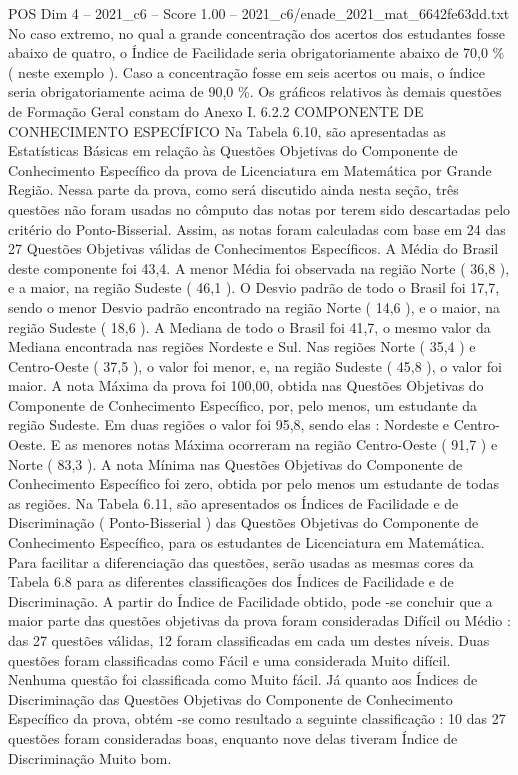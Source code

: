 \begin{textsample}{POS Dim 4 – 2021\_c6 – Score 1.00 – 2021\_c6/enade\_2021\_mat\_6642fe63dd.txt}
No caso extremo, no qual a grande concentração dos acertos dos estudantes fosse abaixo de quatro, o Índice de Facilidade seria obrigatoriamente abaixo de 70,0 \% ( neste exemplo ).
Caso a concentração fosse em seis acertos ou mais, o índice seria obrigatoriamente acima de 90,0 \%.
Os gráficos relativos às demais questões de Formação Geral constam do Anexo I. 6.2.2 COMPONENTE DE CONHECIMENTO ESPECÍFICO Na Tabela 6.10, são apresentadas as Estatísticas Básicas em relação às Questões Objetivas do Componente de Conhecimento Específico da prova de Licenciatura em Matemática por Grande Região.
Nessa parte da prova, como será discutido ainda nesta seção, três questões não foram usadas no cômputo das notas por terem sido descartadas pelo critério do Ponto-Bisserial.
Assim, as notas foram calculadas com base em 24 das 27 Questões Objetivas válidas de Conhecimentos Específicos.
A Média do Brasil deste componente foi 43,4.
A menor Média foi observada na região Norte ( 36,8 ), e a maior, na região Sudeste ( 46,1 ).
O Desvio padrão de todo o Brasil foi 17,7, sendo o menor Desvio padrão encontrado na região Norte ( 14,6 ), e o maior, na região Sudeste ( 18,6 ).
A Mediana de todo o Brasil foi 41,7, o mesmo valor da Mediana encontrada nas regiões Nordeste e Sul.
Nas regiões Norte ( 35,4 ) e Centro-Oeste ( 37,5 ), o valor foi menor, e, na região Sudeste ( 45,8 ), o valor foi maior.
A nota Máxima da prova foi 100,00, obtida nas Questões Objetivas do Componente de Conhecimento Específico, por, pelo menos, um estudante da região Sudeste.
Em duas regiões o valor foi 95,8, sendo elas : Nordeste e Centro-Oeste.
E as menores notas Máxima ocorreram na região Centro-Oeste ( 91,7 ) e Norte ( 83,3 ).
A nota Mínima nas Questões Objetivas do Componente de Conhecimento Específico foi zero, obtida por pelo menos um estudante de todas as regiões.
Na Tabela 6.11, são apresentados os Índices de Facilidade e de Discriminação ( Ponto-Bisserial ) das Questões Objetivas do Componente de Conhecimento Específico, para os estudantes de Licenciatura em Matemática.
Para facilitar a diferenciação das questões, serão usadas as mesmas cores da Tabela 6.8 para as diferentes classificações dos Índices de Facilidade e de Discriminação.
A partir do Índice de Facilidade obtido, pode -se concluir que a maior parte das questões objetivas da prova foram consideradas Difícil ou Médio : das 27 questões válidas, 12 foram classificadas em cada um destes níveis.
Duas questões foram classificadas como Fácil e uma considerada Muito difícil.
Nenhuma questão foi classificada como Muito fácil.
Já quanto aos Índices de Discriminação das Questões Objetivas do Componente de Conhecimento Específico da prova, obtém -se como resultado a seguinte classificação : 10 das 27 questões foram consideradas boas, enquanto nove delas tiveram Índice de Discriminação Muito bom.

\end{textsample}
